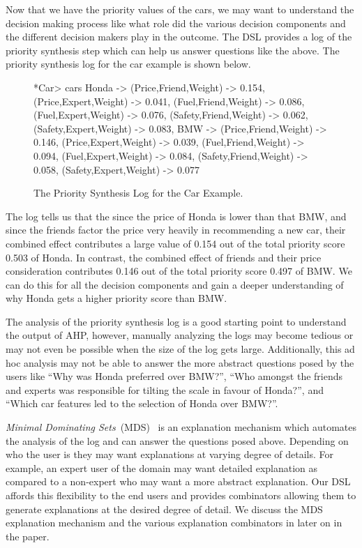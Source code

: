 \documentclass{jfp}
\begin{document}
Now that we have the priority values of the cars, we may want to understand the decision making process like what role did the various decision components and the different decision makers play in the outcome. The DSL provides a log of the priority synthesis step which can help us answer questions like the above. The priority synthesis log for the car example is shown below. 
\begin{figure}
    \centering
\begin{haskellcode}
*Car> cars
{Honda -> {(Price,Friend,Weight) -> 0.154,
           (Price,Expert,Weight) -> 0.041,
           (Fuel,Friend,Weight) -> 0.086,
           (Fuel,Expert,Weight) -> 0.076,
           (Safety,Friend,Weight) -> 0.062,
           (Safety,Expert,Weight) -> 0.083},
 BMW   -> {(Price,Friend,Weight) -> 0.146,
           (Price,Expert,Weight) -> 0.039,
           (Fuel,Friend,Weight) -> 0.094,
           (Fuel,Expert,Weight) -> 0.084,
           (Safety,Friend,Weight) -> 0.058,
           (Safety,Expert,Weight) -> 0.077}}
\end{haskellcode}
    \caption{The Priority Synthesis Log for the Car Example.}
    \label{fig:PriorityLog}
\end{figure}

The log tells us that the since the price of Honda is lower than that BMW, and since the friends factor the price very heavily in recommending a new car, their combined effect contributes a large value of 0.154 out of the total priority score 0.503 of Honda. In contrast, the combined effect of friends and their price consideration contributes 0.146 out of the total priority score 0.497 of BMW. We can do this for all the decision components and gain a deeper understanding of why Honda gets a higher priority score than BMW.

The analysis of the priority synthesis log is a good starting point to understand the output of AHP, however, manually analyzing the logs may become tedious or may not even be possible when the size of the log gets large. Additionally, this ad hoc analysis may not be able to answer the more abstract questions posed by the users like ``Why was Honda preferred over BMW?'', ``Who amongst the friends and experts was responsible for tilting the scale in favour of Honda?'', and ``Which car features led to the selection of Honda over BMW?''. 

\emph{Minimal Dominating Sets}~(MDS)~\citep{DBLP:conf/padl/ErwigKF20} is an explanation mechanism which automates the analysis of the log and can answer the questions posed above. Depending on who the user is they may want explanations at varying degree of details. For example, an expert user of the domain may want detailed explanation as compared to a non-expert who may want a more abstract explanation. Our DSL affords this flexibility to the end users and provides combinators allowing them to generate explanations at the desired degree of detail. We discuss the MDS explanation mechanism and the various explanation combinators in later on in the paper. 
\end{document}
